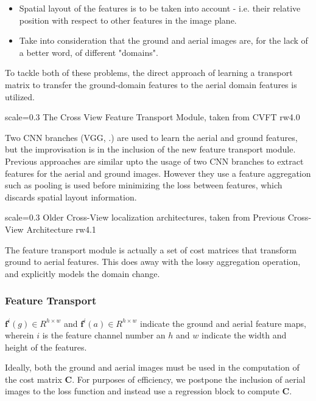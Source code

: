 \begin{itemize}
	\item Spatial layout of the features is to be taken into account - i.e. their relative position with respect to other features in the image plane. 
	
	\item Take into consideration that the ground and aerial images are, for the lack of a better word, of different "domains". 
\end{itemize}

To tackle both of these problems, the direct approach of learning a transport matrix to transfer the ground-domain features to the aerial domain features is utilized. 

{scale=0.3}%
{The Cross View Feature Transport Module, taken from \cite{Shi2019}}%
{CVFT}%
{rw4.0} %

Two CNN branches (VGG, \cite{Simonyan2015}.) are used to learn the aerial and ground features, but the improvisation is in the inclusion of the new feature transport module. Previous approaches are similar upto the usage of two CNN branches to extract features for the aerial and ground images. However they use a feature aggregation such as pooling is used before minimizing the loss between features, which discards spatial layout information.

{scale=0.3}%
{Older Cross-View localization architectures, taken from \cite{Shi2019}}%
{Previous Cross-View Architecture}%
{rw4.1} %

The feature transport module is actually a set of cost matrices that transform ground to aerial features. This does away with the lossy aggregation operation, and explicitly models the domain change.

\subsubsection{Feature Transport}
$\mathbf{f}^i(g) \in R^{h \times w}$ and $\mathbf{f}^i(a) \in R^{h \times w}$ indicate the ground and aerial feature maps, wherein $i$ is the feature channel number an $h$ and $w$ indicate the width and height of the features.

Ideally, both the ground and aerial images must be used in the computation of the cost matrix $\mathbf{C}$. For purposes of efficiency, we postpone the inclusion of aerial images to the loss function and instead use a regression block to compute $\mathbf{C}$.


